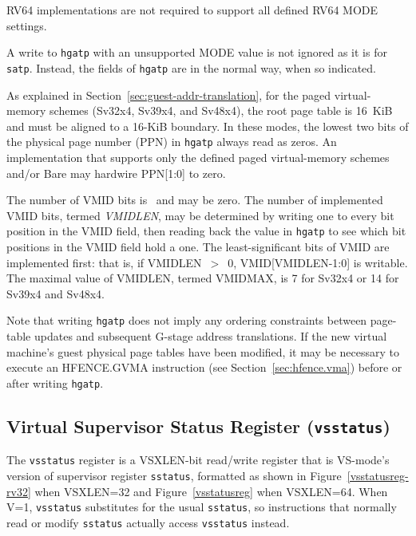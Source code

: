 RV64 implementations are not required to support all defined RV64 MODE
settings.

A write to {\tt hgatp} with an unsupported MODE value is not ignored as it is
for {\tt satp}.
Instead, the fields of {\tt hgatp} are {\warl} in the normal way, when so
indicated.

As explained in Section~\ref{sec:guest-addr-translation}, for the paged
virtual-memory schemes (Sv32x4, Sv39x4, and Sv48x4), the root page table is
16~KiB and must be aligned to a 16-KiB boundary.
In these modes, the lowest two bits of the physical page number (PPN) in
{\tt hgatp} always read as zeros.
An implementation that supports only the defined paged virtual-memory schemes
and/or Bare may hardwire PPN[1:0] to zero.

The number of VMID bits is \unspecified\ and may be zero.
The number of implemented VMID bits, termed {\mbox {\em VMIDLEN}}, may be
determined by writing one to every bit position in the VMID field, then reading
back the value in {\tt hgatp} to see which bit positions in the VMID field hold
a one.
The least-significant bits of VMID are implemented first:
that is, if VMIDLEN~$>$~0, VMID[VMIDLEN-1:0] is writable.
The maximal value of VMIDLEN, termed VMIDMAX, is 7 for Sv32x4 or 14 for Sv39x4
and Sv48x4.

Note that writing {\tt hgatp} does not imply any ordering constraints between
page-table updates and subsequent G-stage address translations.
If the new virtual machine's guest physical page tables have been modified, it
may be necessary to execute an HFENCE.GVMA instruction
(see Section~\ref{sec:hfence.vma}) before or after writing {\tt hgatp}.

\subsection{Virtual Supervisor Status Register ({\tt vsstatus})}

The {\tt vsstatus} register is a VSXLEN-bit read/write register that is
VS-mode's version of supervisor register {\tt sstatus}, formatted as
shown in Figure~\ref{vsstatusreg-rv32} when VSXLEN=32 and
Figure~\ref{vsstatusreg} when VSXLEN=64.
When V=1, {\tt vsstatus} substitutes for the usual {\tt sstatus}, so
instructions that normally read or modify {\tt sstatus} actually access
{\tt vsstatus} instead.

